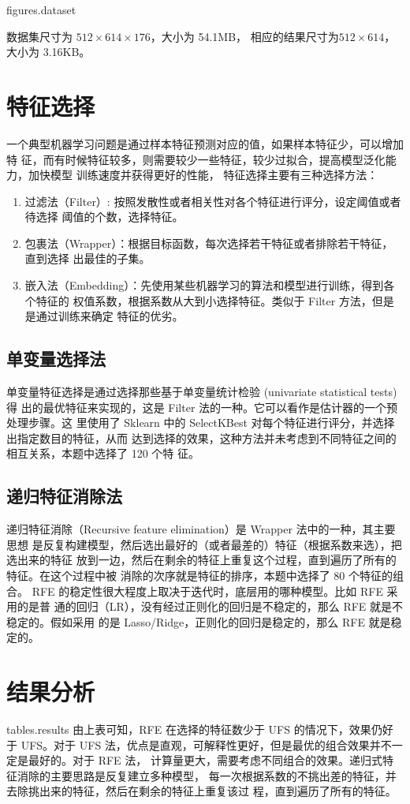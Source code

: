 \documentclass[cn,hazy,blue,14pt,normal]{elegantnote}
\begin{document}
{{figures.dataset}}

数据集尺寸为 $512 \times 614  \times 176$，大小为 54.1MB，
相应的结果尺寸为$ 512 \times 614$，大小为 3.16KB。

\section{特征选择}
一个典型机器学习问题是通过样本特征预测对应的值，如果样本特征少，可以增加特
征，而有时候特征较多，则需要较少一些特征，较少过拟合，提高模型泛化能力，加快模型
训练速度并获得更好的性能，
特征选择主要有三种选择方法：
\begin{enumerate}
    \item 过滤法（Filter）: 按照发散性或者相关性对各个特征进行评分，设定阈值或者待选择
          阈值的个数，选择特征。
    \item 包裹法（Wrapper）：根据目标函数，每次选择若干特征或者排除若干特征，直到选择
          出最佳的子集。
    \item 嵌入法（Embedding）：先使用某些机器学习的算法和模型进行训练，得到各个特征的
          权值系数，根据系数从大到小选择特征。类似于 Filter 方法，但是是通过训练来确定
          特征的优劣。
\end{enumerate}

\subsection{单变量选择法}
单变量特征选择是通过选择那些基于单变量统计检验 (univariate statistical tests) 得
出的最优特征来实现的，这是 Filter 法的一种。它可以看作是估计器的一个预处理步骤。这
里使用了 Sklearn 中的 SelectKBest 对每个特征进行评分，并选择出指定数目的特征，从而
达到选择的效果，这种方法并未考虑到不同特征之间的相互关系，本题中选择了 120 个特
征。
\subsection{递归特征消除法}
递归特征消除（Recursive feature elimination）是 Wrapper 法中的一种，其主要思想
是反复构建模型，然后选出最好的（或者最差的）特征（根据系数来选），把选出来的特征
放到一边，然后在剩余的特征上重复这个过程，直到遍历了所有的特征。在这个过程中被
消除的次序就是特征的排序，本题中选择了 80 个特征的组合。
RFE 的稳定性很大程度上取决于迭代时，底层用的哪种模型。比如 RFE 采用的是普
通的回归（LR），没有经过正则化的回归是不稳定的，那么 RFE 就是不稳定的。假如采用
的是 Lasso/Ridge，正则化的回归是稳定的，那么 RFE 就是稳定的。

\section{结果分析}
 {{tables.results}}
由上表可知，RFE 在选择的特征数少于 UFS 的情况下，效果仍好于 UFS。对于 UFS
法，优点是直观，可解释性更好，但是最优的组合效果并不一定是最好的。对于 RFE 法，
计算量更大，需要考虑不同组合的效果。递归式特征消除的主要思路是反复建立多种模型，
每一次根据系数的不挑出差的特征，并去除挑出来的特征，然后在剩余的特征上重复该过
程，直到遍历了所有的特征。
\end{document}
